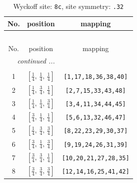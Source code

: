 \documentclass[fleqn,8pt]{jsarticle}
\begin{document}
\renewcommand{\arraystretch}{1.2}
\begin{longtable}{ccc}
\caption{Wyckoff site: {\tt 8c}, site symmetry: {\tt .32}}
 \\
 \hline \hline
No. & position & mapping \\ \hline \endfirsthead

\multicolumn{2}{l}{\tablename\ \thetable{}} \\
 \hline \hline
No. & position & mapping \\ \hline \endhead

 \hline \hline
\multicolumn{2}{r}{\footnotesize\it continued ...} \\ \endfoot

 \hline \hline
\multicolumn{2}{r}{} \\ \endlastfoot

1 & $\left[ \frac{1}{4},\, \frac{1}{4},\, \frac{1}{4} \right]$ & {\tt [1,17,18,36,38,40]} \\ \hline
2 & $\left[ \frac{1}{4},\, \frac{3}{4},\, \frac{1}{4} \right]$ & {\tt [2,7,15,33,43,48]} \\ \hline
3 & $\left[ \frac{1}{4},\, \frac{1}{4},\, \frac{3}{4} \right]$ & {\tt [3,4,11,34,44,45]} \\ \hline
4 & $\left[ \frac{3}{4},\, \frac{1}{4},\, \frac{1}{4} \right]$ & {\tt [5,6,13,32,46,47]} \\ \hline
5 & $\left[ \frac{1}{4},\, \frac{3}{4},\, \frac{3}{4} \right]$ & {\tt [8,22,23,29,30,37]} \\ \hline
6 & $\left[ \frac{3}{4},\, \frac{1}{4},\, \frac{3}{4} \right]$ & {\tt [9,19,24,26,31,39]} \\ \hline
7 & $\left[ \frac{3}{4},\, \frac{3}{4},\, \frac{1}{4} \right]$ & {\tt [10,20,21,27,28,35]} \\ \hline
8 & $\left[ \frac{3}{4},\, \frac{3}{4},\, \frac{3}{4} \right]$ & {\tt [12,14,16,25,41,42]} \\
\end{longtable}
\renewcommand{\arraystretch}{1.2}
\end{document}
